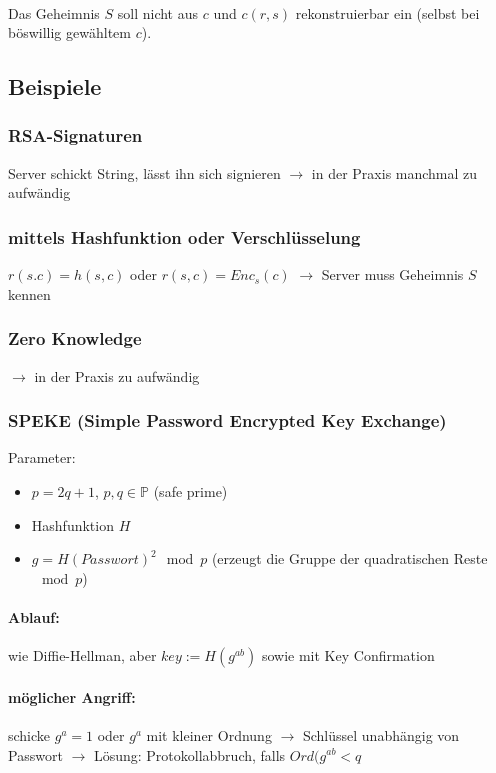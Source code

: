 \documentclass[a4paper,twoside,DIV15,BCOR12mm]{scrbook}
\begin{document}
\\

Das Geheimnis $S$ soll nicht aus $c$ und $c(r,s)$ rekonstruierbar ein (selbst bei böswillig gewähltem $c$).

\subsection{Beispiele}

\subsubsection{RSA-Signaturen} Server schickt String, lässt ihn sich signieren $\rightarrow$ in der Praxis manchmal zu aufwändig
\subsubsection{mittels Hashfunktion oder Verschlüsselung} $r(s.c) = h(s,c)$ oder $r(s,c) = Enc_s(c)$ $\rightarrow$ Server muss Geheimnis $S$ kennen
\subsubsection{Zero Knowledge} $\rightarrow$ in der Praxis zu aufwändig
\subsubsection{SPEKE (Simple Password Encrypted Key Exchange)}

Parameter:

	\begin{itemize}	
		\item $p = 2q + 1$, $p,q \in \mathbb{P}$ (\glqq safe prime\grqq)
		\item Hashfunktion $H$
		\item $g = H(Passwort)^2 \mod{p}$ (erzeugt die Gruppe der quadratischen Reste $\mod{p}$)
	\end{itemize}
	
\paragraph{Ablauf:} wie Diffie-Hellman, aber $key := H(g^{ab})$ sowie mit Key Confirmation\\ 


\paragraph{möglicher Angriff:} schicke $g^a =1$ oder $g^a$ mit kleiner Ordnung $\rightarrow$ Schlüssel unabhängig von Passwort $\rightarrow$ Lösung: Protokollabbruch, falls $Ord(g^{ab} < q$
\end{document}
